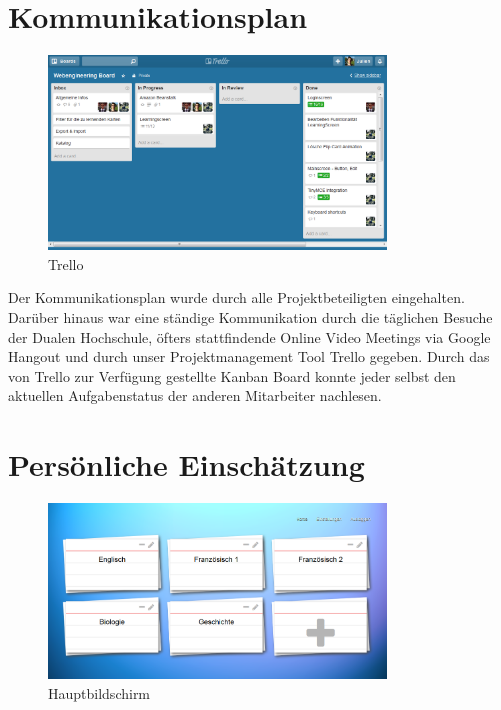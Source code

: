 \documentclass{article}
\begin{document}
\section{Kommunikationsplan}

\begin{figure}[H]
    \centering
    \includegraphics[width=0.8\textwidth]{images/trello.png}
    \caption{Trello}
    \label{fig:trello}
\end{figure}

Der Kommunikationsplan wurde durch alle Projektbeteiligten eingehalten. Darüber hinaus war eine ständige Kommunikation durch die täglichen Besuche der Dualen Hochschule, öfters stattfindende Online Video Meetings via Google Hangout und durch unser Projektmanagement Tool Trello gegeben. Durch das von Trello zur Verfügung gestellte Kanban Board konnte jeder selbst den aktuellen Aufgabenstatus der anderen Mitarbeiter nachlesen. 

\section{Persönliche Einschätzung}

\begin{figure}[H]
    \centering
    \includegraphics[width=0.8\textwidth]{images/overview.png}
    \caption{Hauptbildschirm}
    \label{fig:dashboard}
\end{figure}
\end{document}
